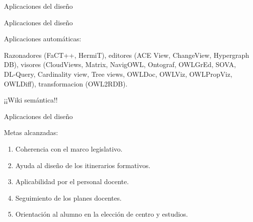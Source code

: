 \documentclass{beamer}
\begin{document}
\begin{frame}{Aplicaciones del diseño}
%   	
%	
	
\end{frame}

\begin{frame}{Aplicaciones del diseño}
\begin{LARGE}
	Aplicaciones automáticas:
	
	Razonadores (FaCT++, HermiT), editores (ACE View, ChangeView, Hypergraph DB), visores (CloudViews, Matrix, NavigOWL, Ontograf, OWLGrEd, SOVA, DL-Query, Cardinality view, Tree views, OWLDoc, OWLViz, OWLPropViz, OWLDiff), transformacion (OWL2RDB).
\end{LARGE}
	
\begin{center}
	{\Huge ¡¡Wiki semántica!!}
\end{center}

\end{frame}


\begin{frame}{Aplicaciones del diseño}
\begin{LARGE}
	Metas alcanzadas:
	\begin{enumerate}
		\item Coherencia con el marco legislativo.
		\item Ayuda al diseño de los itinerarios formativos.
		\item Aplicabilidad por el personal docente.
		\item Seguimiento de los planes docentes.
		\item Orientación al alumno en la elección de centro y estudios.
	\end{enumerate}
\end{LARGE}
\end{frame}
\end{document}
